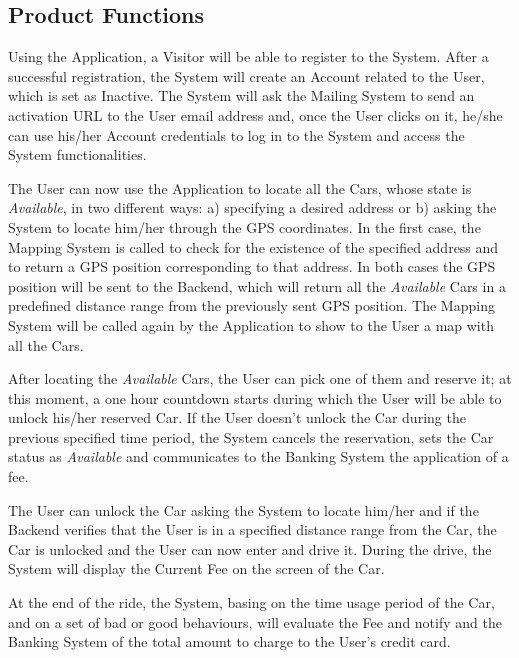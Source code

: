 \subsection{Product Functions}
Using the Application, a Visitor will be able to register to the System. After a successful registration, the System will create an Account related to the User, which is set as Inactive. The System will ask the Mailing System to send an activation URL to the User email address and, once the User clicks on it, he/she can use his/her Account credentials to log in to the System and access the System functionalities.

The User can now use the Application to locate all the Cars, whose state is \textit{Available}, in two different ways: a) specifying a desired address or b) asking the System to locate him/her through the GPS coordinates. In the first case, the Mapping System is called to check for the existence of the specified address and to return a GPS position corresponding to that address. In both cases the GPS position will be sent to the Backend, which will return all the \textit{Available} Cars in a predefined distance range from the previously sent GPS position. The Mapping System will be called again by the Application to show to the User a map with all the Cars.

After locating the \textit{Available} Cars, the User can pick one of them and reserve it; at this moment, a one hour countdown starts during which the User will be able to unlock his/her reserved Car. If the User doesn't unlock the Car during the previous specified time period, the System cancels the reservation, sets the Car status as \textit{Available} and communicates to the Banking System the application of a fee.

The User can unlock the Car asking the System to locate him/her and if the Backend verifies that the User is in a specified distance range from the Car, the Car is unlocked and the User can now enter and drive it. During the drive, the System will display the Current Fee on the screen of the Car.

At the end of the ride, the System, basing on the time usage period of the Car, and on a set of bad or good behaviours, will evaluate the Fee and notify and the Banking System of the total amount to charge to the User's credit card.

